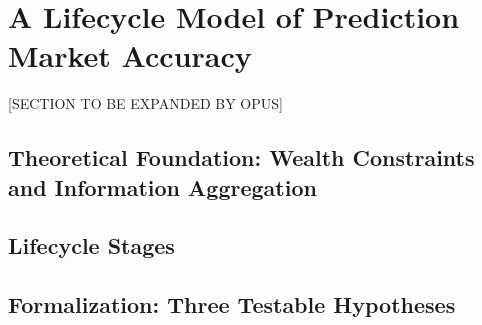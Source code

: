 \section{A Lifecycle Model of Prediction Market Accuracy}
\label{sec:theory}

[SECTION TO BE EXPANDED BY OPUS]


\subsection{Theoretical Foundation: Wealth Constraints and Information Aggregation}
\label{subsec:foundation}


\subsection{Lifecycle Stages}
\label{subsec:stages}


\subsection{Formalization: Three Testable Hypotheses}
\label{subsec:hypotheses}

